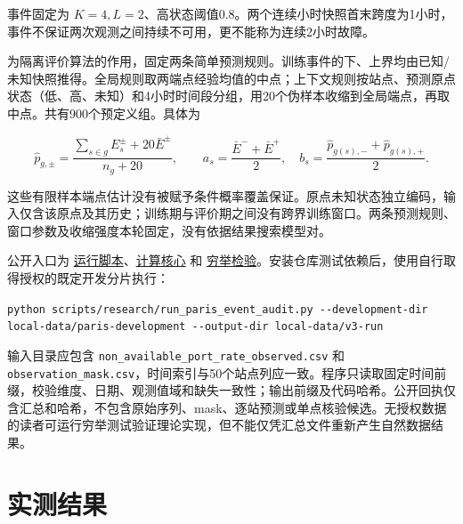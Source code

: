 \documentclass[UTF8,11pt,a4paper,fontset=windows]{ctexart}
\begin{document}
事件固定为 $K=4,L=2$、高状态阈值0.8。两个连续小时快照首末跨度为1小时，事件不保证两次观测之间持续不可用，更不能称为连续2小时故障。


为隔离评价算法的作用，固定两条简单预测规则。训练事件的下、上界均由已知/未知快照推得。全局规则取两端点经验均值的中点；上下文规则按站点、预测原点状态（低、高、未知）和4小时时间段分组，用20个伪样本收缩到全局端点，再取中点。共有900个预定义组。具体为


\begin{equation}
\widehat p_{g,\pm}=\frac{\sum_{s\in g}E_s^\pm+20\bar E^\pm}{n_g+20},\qquad a_s=\frac{\bar E^-+\bar E^+}{2},\quad b_s=\frac{\widehat p_{g(s),-}+\widehat p_{g(s),+}}2.\tag{R3}
\end{equation}

这些有限样本端点估计没有被赋予条件概率覆盖保证。原点未知状态独立编码，输入仅含该原点及其历史；训练期与评价期之间没有跨界训练窗口。两条预测规则、窗口参数及收缩强度本轮固定，没有依据结果搜索模型对。


公开入口为 \href{https://github.com/FreeSakura/UrbanEV/blob/main/scripts/research/run_paris_event_audit.py}{运行脚本}、\href{https://github.com/FreeSakura/UrbanEV/blob/main/src/urbanev_audit/paired_events.py}{计算核心} 和 \href{https://github.com/FreeSakura/UrbanEV/blob/main/tests/test_paired_events.py}{穷举检验}。安装仓库测试依赖后，使用自行取得授权的既定开发分片执行：


\allowbreak{}\texttt{python scripts/\allowbreak{}research/\allowbreak{}run\_\allowbreak{}paris\_\allowbreak{}event\_\allowbreak{}audit.py -\allowbreak{}-\allowbreak{}development-\allowbreak{}dir local-\allowbreak{}data/\allowbreak{}paris-\allowbreak{}development -\allowbreak{}-\allowbreak{}output-\allowbreak{}dir local-\allowbreak{}data/\allowbreak{}v3-\allowbreak{}run}\allowbreak{}


输入目录应包含 \allowbreak{}\texttt{non\_\allowbreak{}available\_\allowbreak{}port\_\allowbreak{}rate\_\allowbreak{}observed.csv}\allowbreak{} 和 \allowbreak{}\texttt{observation\_\allowbreak{}mask.csv}\allowbreak{}，时间索引与50个站点列应一致。程序只读取固定时间前缀，校验维度、日期、观测值域和缺失一致性；输出前缀及代码哈希。公开回执仅含汇总和哈希，不包含原始序列、mask、逐站预测或单点核验候选。无授权数据的读者可运行穷举测试验证理论实现，但不能仅凭汇总文件重新产生自然数据结果。


\section{实测结果}
\end{document}
